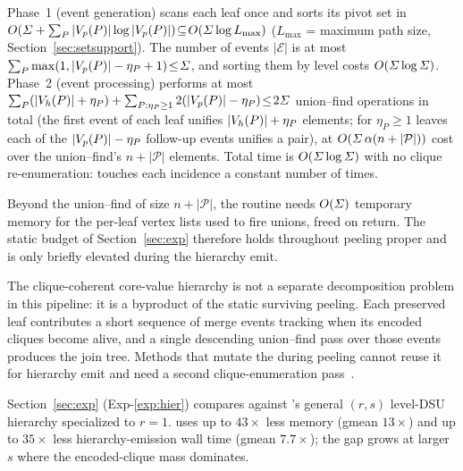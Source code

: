 Phase~1 (event generation) scans each leaf once and sorts its pivot set in $O(\varSigma+\sum_{P}|V_p(P)|\log|V_p(P)|)\!\subseteq\!O(\varSigma\log L_{\max})$ ($L_{\max}$ = maximum path size, Section~\ref{sec:setsupport}).
%
The number of events $|\mathcal{E}|$ is at most $\sum_P\max(1,|V_p(P)|-\eta_P+1)\!\le\!\varSigma$, and sorting them by level costs $O(\varSigma\log\varSigma)$.
%
Phase~2 (event processing) performs at most $\sum_P(|V_h(P)|+\eta_P)+\sum_{P:\eta_P\ge1} 2(|V_p(P)|-\eta_P)\!\le\!2\varSigma$ union--find operations in total (the first event of each leaf unifies $|V_h(P)|+\eta_P$ elements; for $\eta_P\!\ge\!1$ leaves each of the $|V_p(P)|-\eta_P$ follow-up events unifies a pair), at $O(\varSigma\,\alpha(n+|\mathcal{P}|))$ cost over the union--find's $n+|\mathcal{P}|$ elements.
%
Total time is $O(\varSigma\log\varSigma)$ with no clique re-enumeration: \buildHier{} touches each \cpi{} incidence a constant number of times.

Beyond the union--find of size $n+|\mathcal{P}|$, the routine needs $O(\varSigma)$ temporary memory for the per-leaf vertex lists used to fire unions, freed on return.
%
The static \cpi{} budget of Section~\ref{sec:exp} therefore holds throughout peeling proper and is only briefly elevated during the hierarchy emit.

The clique-coherent core-value hierarchy is not a separate decomposition problem in this pipeline: it is a byproduct of the static \cpi{} surviving peeling. Each preserved leaf contributes a short sequence of merge events tracking when its encoded cliques become alive, and a single descending union--find pass over those events produces the join tree.
%
Methods that mutate the \cpi{} during peeling cannot reuse it for hierarchy emit and need a second clique-enumeration pass~\cite{nucleusSariyuce14}.

Section~\ref{sec:exp} (Exp-\ref{exp:hier}) compares \buildHier{} against \cbnd{}'s general $(r,s)$ level-DSU hierarchy specialized to $r{=}1$.
%
\buildHier{} uses up to $43\times$ less memory (gmean $13\times$) and up to $35\times$ less hierarchy-emission wall time (gmean $7.7\times$); the gap grows at larger $s$ where the encoded-clique mass dominates.
